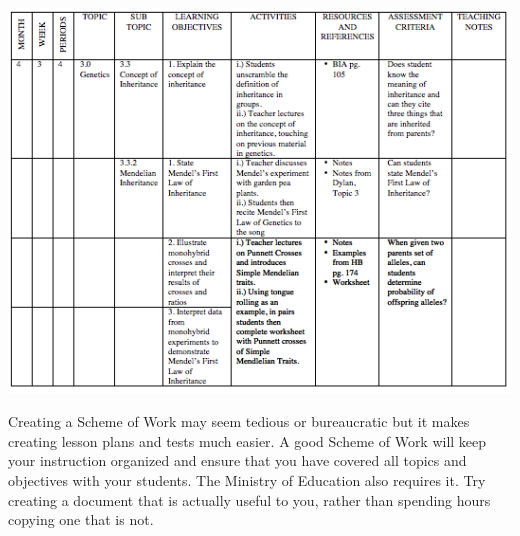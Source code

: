 \begin{flushleft}
\includegraphics[scale=1]{./img/picture-4.png} 
\end{flushleft}

Creating a Scheme of Work may seem tedious or bureaucratic but it makes creating lesson plans and tests much easier.  A good Scheme of Work will keep your instruction organized and ensure that you have covered all topics and objectives with your students.  The Ministry of Education also requires it.   Try creating a document that is actually useful to you, rather than spending hours copying one that is not.
